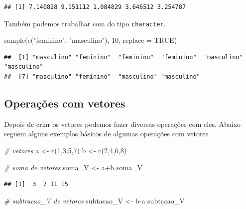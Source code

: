 \documentclass[
]{book}
\newenvironment{Shaded}{\begin{snugshade}}{\end{snugshade}}
\newcommand{\AttributeTok}[1]{\textcolor[rgb]{0.77,0.63,0.00}{#1}}
\newcommand{\CommentTok}[1]{\textcolor[rgb]{0.56,0.35,0.01}{\textit{#1}}}
\newcommand{\ConstantTok}[1]{\textcolor[rgb]{0.00,0.00,0.00}{#1}}
\newcommand{\DecValTok}[1]{\textcolor[rgb]{0.00,0.00,0.81}{#1}}
\newcommand{\FunctionTok}[1]{\textcolor[rgb]{0.00,0.00,0.00}{#1}}
\newcommand{\NormalTok}[1]{#1}
\newcommand{\OtherTok}[1]{\textcolor[rgb]{0.56,0.35,0.01}{#1}}
\newcommand{\SpecialCharTok}[1]{\textcolor[rgb]{0.00,0.00,0.00}{#1}}
\newcommand{\StringTok}[1]{\textcolor[rgb]{0.31,0.60,0.02}{#1}}
\begin{document}
\begin{verbatim}
## [1] 7.140828 9.151112 1.084829 3.646512 3.254787
\end{verbatim}

Também podemos trabalhar com do tipo \texttt{character}.

\begin{Shaded}
\begin{Highlighting}[]
\FunctionTok{sample}\NormalTok{(}\FunctionTok{c}\NormalTok{(}\StringTok{"feminino"}\NormalTok{, }\StringTok{"masculino"}\NormalTok{), }\DecValTok{10}\NormalTok{, }\AttributeTok{replace =} \ConstantTok{TRUE}\NormalTok{)}
\end{Highlighting}
\end{Shaded}

\begin{verbatim}
##  [1] "masculino" "feminino"  "feminino"  "feminino"  "masculino" "masculino"
##  [7] "masculino" "feminino"  "masculino" "masculino"
\end{verbatim}

\hypertarget{operauxe7uxf5es-com-vetores}{%
\subsection{Operações com vetores}\label{operauxe7uxf5es-com-vetores}}

Depois de criar os vetores podemos fazer diversas operações com eles. Abaixo seguem alguns exemplos básicos de algumas operações com vetores.

\begin{Shaded}
\begin{Highlighting}[]
\CommentTok{\# vetores}
\NormalTok{a }\OtherTok{\textless{}{-}} \FunctionTok{c}\NormalTok{(}\DecValTok{1}\NormalTok{,}\DecValTok{3}\NormalTok{,}\DecValTok{5}\NormalTok{,}\DecValTok{7}\NormalTok{)}
\NormalTok{b }\OtherTok{\textless{}{-}} \FunctionTok{c}\NormalTok{(}\DecValTok{2}\NormalTok{,}\DecValTok{4}\NormalTok{,}\DecValTok{6}\NormalTok{,}\DecValTok{8}\NormalTok{)}

\CommentTok{\# soma de vetores}
\NormalTok{soma\_V }\OtherTok{\textless{}{-}}\NormalTok{ a}\SpecialCharTok{+}\NormalTok{b}
\NormalTok{soma\_V}
\end{Highlighting}
\end{Shaded}

\begin{verbatim}
## [1]  3  7 11 15
\end{verbatim}

\begin{Shaded}
\begin{Highlighting}[]
\CommentTok{\# subtracao\_V de vetores}
\NormalTok{subtacao\_V }\OtherTok{\textless{}{-}}\NormalTok{ b}\SpecialCharTok{{-}}\NormalTok{a}
\NormalTok{subtacao\_V}
\end{Highlighting}
\end{Shaded}
\end{document}
